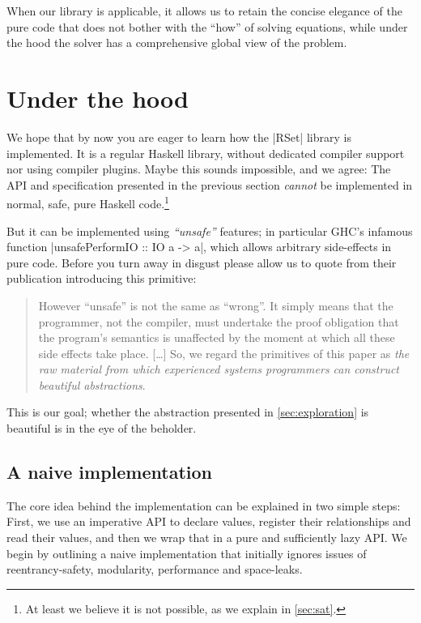 \documentclass[manuscript,review,screen,acmsmall]{acmart}
\begin{document}
When our library is applicable, it allows us to retain the concise elegance of the pure code that does not bother with the “how” of solving equations, while under the hood the solver has a comprehensive global view of the problem.


\section{Under the hood}\label{sec:impl}

We hope that by now you are eager to learn how the |RSet| library is implemented. It is a regular Haskell library, without dedicated compiler support nor using compiler plugins. Maybe this sounds impossible, and we agree: The API and specification presented in the previous section \emph{cannot} be implemented in normal, safe, pure Haskell code.\footnote{At least we believe it is not possible, as we explain in \cref{sec:sat}.}

But it can be implemented using \emph{“unsafe”} features; in particular GHC's infamous function |unsafePerformIO :: IO a -> a|, which allows arbitrary side-effects in pure code. Before you turn away in disgust please allow us to quote \citet{unsafePerformIO} from their publication introducing this primitive:
\begin{quote}
However “unsafe” is not the same as “wrong”. It simply means that the programmer, not the compiler, must undertake the proof obligation that the program's semantics is unaffected by the moment at which all these side effects take place. [\ldots]
So, we regard the primitives of this paper as \emph{the raw material from which experienced systems programmers can construct beautiful abstractions}.
\end{quote}
This is our goal; whether the abstraction presented in \cref{sec:exploration} is beautiful is in the eye of the beholder.

\subsection{A naive implementation}

The core idea behind the implementation can be explained in two simple steps: First, we use an imperative API to declare values, register their relationships and read their values, and then we wrap that in a pure and sufficiently lazy API. We begin by outlining a naive implementation that initially ignores issues of reentrancy-safety, modularity, performance and space-leaks.
\end{document}
